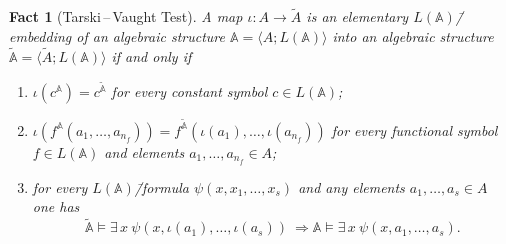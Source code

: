 \documentclass[12pt]{article}
\newtheorem{fact}{Fact}
\theoremstyle{definition}
\def\MA{{\mathbb{A}}}
\newcommand{\nsA}{\widetilde{\mathbb A}}
\newcommand{\nsuA}{\widetilde{A}}
\begin{document}
\begin{fact}[Tarski\,--\,Vaught Test]\label{TV}
A map $\iota\colon A\to\nsuA$ is an elementary $L(\MA)$\=/embedding of an algebraic structure $\MA=\langle A; L(\MA)\rangle$ into an algebraic structure $\nsA=\langle \nsuA; L(\MA)\rangle$ if and only if 
\begin{enumerate}[label=(\arabic*)]
\item $\iota(c^{\MA})=c^{\nsA}$ for every constant symbol $c\in L(\MA)$;
\item $\iota(f^{\MA}(a_1,\ldots,a_{n_f}))=f^{\nsA}(\iota(a_1),\ldots,\iota(a_{n_f}))$ for every functional symbol $f\in L(\MA)$ and elements $a_1,\ldots,a_{n_f}\in A$;
\item for every $L(\MA)$\=/formula $\psi(x,x_1,\ldots,x_s)$ and any elements $a_1,\ldots,a_s\in A$ one has
$$
\nsA\models \exists\,x\:\psi(x,\iota(a_1),\ldots,\iota(a_s)) \ \Longrightarrow \MA\models\exists\, x\:\psi(x,a_1,\ldots,a_s).
$$
\end{enumerate}
\end{fact}
\end{document}
